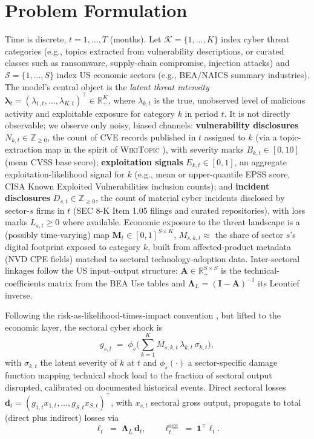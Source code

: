 \documentclass[review]{elsarticle}
\newcommand{\R}{\mathbb{R}}
\begin{document}
\section{Problem Formulation}\label{sec:formulation}

Time is discrete, $t = 1, \dots, T$ (months). Let $\mathcal{K} = \{1, \dots, K\}$ index cyber threat categories (e.g., topics extracted from vulnerability descriptions, or curated classes such as ransomware, supply-chain compromise, injection attacks) and $\mathcal{S} = \{1, \dots, S\}$ index US economic sectors (e.g., BEA/NAICS summary industries). The model's central object is the \emph{latent threat intensity} $\bm{\lambda}_t = (\lambda_{1,t}, \dots, \lambda_{K,t})^\top \in \R_{+}^{K}$, where $\lambda_{k,t}$ is the true, unobserved level of malicious activity and exploitable exposure for category $k$ in period $t$. It is not directly observable; we observe only noisy, biased channels: \textbf{vulnerability disclosures} $N_{k,t} \in \mathbb{Z}_{\geq 0}$, the count of CVE records published in $t$ assigned to $k$ (via a topic-extraction map in the spirit of \textsc{WikiTopic} \citep{kia2024}), with severity marks $B_{k,t} \in [0,10]$ (mean CVSS base score); \textbf{exploitation signals} $E_{k,t} \in [0,1]$, an aggregate exploitation-likelihood signal for $k$ (e.g., mean or upper-quantile EPSS score, CISA Known Exploited Vulnerabilities inclusion counts); and \textbf{incident disclosures} $D_{s,t} \in \mathbb{Z}_{\geq 0}$, the count of material cyber incidents disclosed by sector-$s$ firms in $t$ (SEC 8-K Item 1.05 filings and curated repositories), with loss marks $L_{s,t} \geq 0$ where available. Economic exposure to the threat landscape is a (possibly time-varying) map $\bm{M}_t \in [0,1]^{S \times K}$, $M_{s,k,t} \approx$ the share of sector $s$'s digital footprint exposed to category $k$, built from affected-product metadata (NVD CPE fields) matched to sectoral technology-adoption data. Inter-sectoral linkages follow the US input--output structure: $\bm{A} \in \R_{+}^{S \times S}$ is the technical-coefficients matrix from the BEA Use tables and $\bm{\Lambda}_L = (\bm{I} - \bm{A})^{-1}$ its Leontief inverse.

Following the risk-as-likelihood-times-impact convention \citep{kia2024}, but lifted to the economic layer, the sectoral cyber shock is
\begin{equation}\label{eq:shock}
    g_{s,t} \;=\; \phi_s\!\Big( \textstyle\sum_{k=1}^{K} M_{s,k,t}\, \lambda_{k,t}\, \sigma_{k,t} \Big),
\end{equation}
with $\sigma_{k,t}$ the latent severity of $k$ at $t$ and $\phi_s(\cdot)$ a sector-specific damage function mapping technical shock load to the fraction of sectoral output disrupted, calibrated on documented historical events. Direct sectoral losses $\bm{d}_t = (g_{1,t} x_{1,t}, \dots, g_{S,t} x_{S,t})^\top$, with $x_{s,t}$ sectoral gross output, propagate to total (direct plus indirect) losses via
\begin{equation}\label{eq:leontief}
    \bm{\ell}_t \;=\; \bm{\Lambda}_L\, \bm{d}_t,
    \qquad
    \ell_t^{\mathrm{agg}} \;=\; \bm{1}^\top \bm{\ell}_t .
\end{equation}
\end{document}
